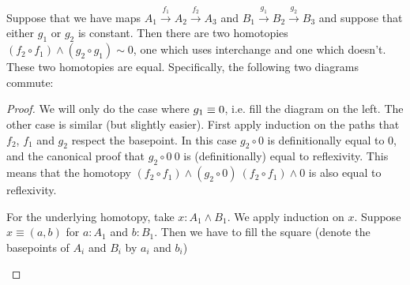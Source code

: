 \documentclass{article}
\newcommand{\lpmap}{\xrightarrow}
\renewcommand{\smash}{\wedge}
\renewcommand{\o}{\ensuremath{\circ}}
\begin{document}
\begin{lem}\label{lem:smash-coh}
  Suppose that we have maps $A_1\lpmap{f_1}A_2\lpmap{f_2}A_3$ and $B_1\lpmap{g_1}B_2\lpmap{g_2}B_3$
  and suppose that either $g_1$ or $g_2$ is constant. Then there are two homotopies
  $(f_2 \o f_1)\smash (g_2 \o g_1)\sim 0$, one which uses interchange and one which doesn't. These two
  homotopies are equal. Specifically, the following two diagrams commute: %
\begin{center}
\qquad
{}
\end{center}

\end{lem}
\begin{proof}
  We will only do the case where $g_1\equiv 0$, i.e. fill the diagram on the left. The other case is
  similar (but slightly easier). First apply induction on the paths that $f_2$, $f_1$ and $g_2$
  respect the basepoint. In this case $g_2\o0$ is definitionally equal to $0$, and the canonical
  proof that $g_2\o 0~0$ is (definitionally) equal to reflexivity. This means that the homotopy
  $(f_2 \o f_1)\smash (g_2 \o 0)~(f_2 \o f_1)\smash 0$ is also equal to reflexivity.

  For the underlying homotopy, take $x : A_1\smash B_1$. We apply induction on $x$.
  Suppose $x\equiv(a,b)$ for $a:A_1$ and $b:B_1$. Then we have to fill the square (denote the basepoints of $A_i$ and $B_i$ by $a_i$ and $b_i$)
  
  \begin{center}
  \end{center}
\end{proof}
\end{document}
